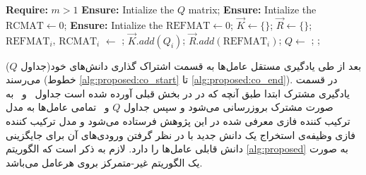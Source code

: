 \begin{algorithm}[t]
\caption{}\label{alg:proposed}
\begin{latin}
\begin{algorithmic}[1]
\State \textbf{Require:} $m > 1$ 
\State \textbf{Ensure:} {Intialize the $Q$ matrix};
\State \textbf{Ensure:} {Intialize the $\text{RCMAT} \gets 0$};
\State \textbf{Ensure:} {Intialize the $\text{REFMAT} \gets 0$};
		 \label{alg:proposed:q_start}
		\label{alg:proposed:il_start}
		 \label{alg:proposed:q_end}
		 \label{alg:proposed:update_refmat}
		\label{alg:proposed:il_end}
		\State $\vec{K} \gets \{\}$; \label{alg:proposed:co_start}
		\State $\vec{R} \gets \{\}$;
			\State $\text{REFMAT}_i$, $\text{RCMAT}_i$ $\gets$ ;
			\State $\vec{K}.add(Q_i)$;
			\State $\vec{R}.add(\text{REFMAT}_i)$;
		\EndFor
		\State $Q \gets$ ; \label{alg:proposed:FCI_Combiner}
		\label{alg:proposed:QCO_replacement}
		;
		\label{alg:proposed:co_end}
	\EndIf
\EndWhile
\EndProcedure
\end{algorithmic}
\end{latin}
\end{algorithm}

بعد از طی یادگیری مستقل عامل‌ها به قسمت اشتراک گذاری دانش‌های خود(جداول $Q$) می‌رسند (خطوط
\ref{alg:proposed:co_start} تا \ref{alg:proposed:co_end}).
در قسمت یادگیری مشترک ابتدا طبق آنچه که در در بخش قبلی آورده شده است جداول \ و \ به صورت مشترک بروزرسانی می‌شود و سپس جداول $Q$ و \ تمامی عامل‌ها به مدل ترکیب کننده فازی معرفی شده در این پژوهش فرستاده می‌شود و مدل ترکیب کننده فازی وظیفه‌ی استخراج یک دانش جدید با در نظر گرفتن ورودی‌های آن برای جایگزینی دانش قابلی عامل‌ها را دارد. لازم به ذکر است که الگوریتم \ref{alg:proposed} به صورت یک الگوریتم غیر-متمرکز بروی هرعامل می‌باشد.

